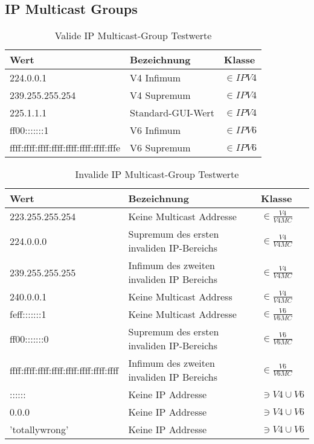 \subsection{IP Multicast Groups}

\begin{table}[H]
\center
\begin{tabular}{l | l | l}
\textbf{Wert} & \textbf{Bezeichnung} & \textbf{Klasse}\\
\hline \hline
224.0.0.1 & V4 Infimum & $\in IPV4$\\
239.255.255.254 & V4 Supremum & $\in IPV4$\\
225.1.1.1 & Standard-GUI-Wert & $\in IPV4$\\
ff00:::::::1 & V6 Infimum & $\in IPV6$\\
ffff:ffff:ffff:ffff:ffff:ffff:ffff:fffe & V6 Supremum & $\in IPV6$\\
\end{tabular}
\caption{Valide IP Multicast-Group Testwerte}
\end{table}

\begin{table}[H]
\center
\begin{tabular}{l | l | l}
\textbf{Wert} & \textbf{Bezeichnung} & \textbf{Klasse} \\
\hline \hline
223.255.255.254 & Keine Multicast Addresse & $\in \frac{V4}{V4MC} $\\
224.0.0.0 & Supremum des ersten invaliden IP-Bereichs & $\in \frac{V4}{V4MC}$\\
239.255.255.255 & Infimum des zweiten invaliden IP Bereichs & $\in
\frac{V4}{V4MC}$\\
240.0.0.1 & Keine Multicast Address & $\in \frac{V4}{V4MC}$\\
feff:::::::1 & Keine Multicast Addresse & $\in \frac{V6}{V6MC} $\\
ff00:::::::0 & Supremum des ersten invaliden IP-Bereichs & $\in
\frac{V6}{V6MC}$\\
ffff:ffff:ffff:ffff:ffff:ffff:ffff:ffff & Infimum des zweiten invaliden IP
Bereichs & $\in \frac{V6}{V6MC}$\\
:::::: & Keine IP Addresse & $\ni V4 \cup V6$\\
0.0.0 & Keine IP Addresse & $\ni V4 \cup V6$\\
'totallywrong' & Keine IP Addresse & $\ni V4 \cup V6$
\end{tabular}
\caption{Invalide IP Multicast-Group Testwerte}
\end{table}

